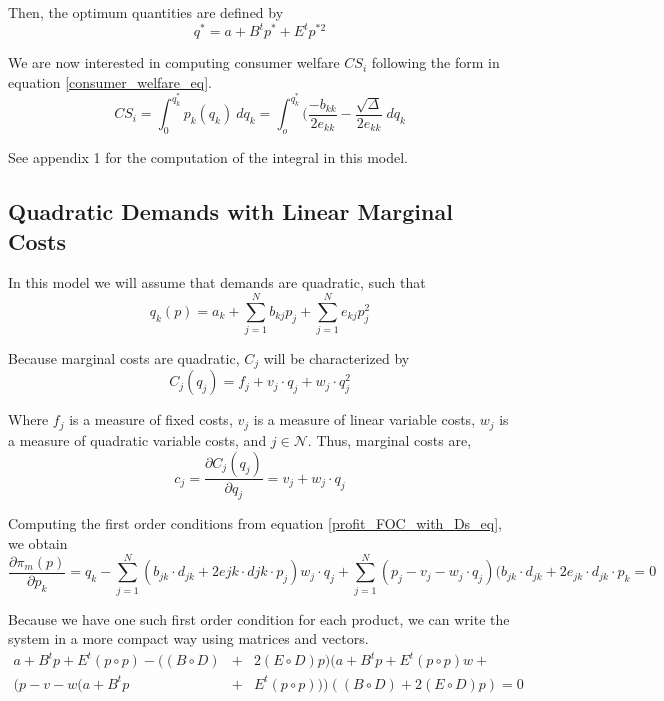 \documentclass[12pt]{article}
\begin{document}
Then, the optimum quantities are defined by 
\begin{equation*}
q^* = a + B^t p^* + E^t p^{*2}
\end{equation*}

We are now interested in computing consumer welfare $CS_i$ following the form in equation \ref{consumer_welfare_eq}.
\begin{equation*}
CS_i = \int_0^{q_k^*} p_k(q_k) \ dq_k = \int_o^{q_k^*} (\frac{-b_{kk}}{2e_{kk}} - \frac{\sqrt{\Delta}}{2e_{kk}} \ dq_k
\end{equation*}

See appendix 1 for the computation of the integral in this model.  

\subsection{Quadratic Demands with Linear Marginal Costs}

In this model we will assume that demands are quadratic, such that
\begin{equation*}
q_k(p) = a_k + \sum_{j = 1}^N b_{kj} p_j + \sum_{j = 1}^N e_{kj}p_j^2
\end{equation*}

Because marginal costs are quadratic, $C_j$ will be characterized by
\begin{equation*}
C_j(q_j) = f_j + v_j \cdot q_j + w_j \cdot q_j^2
\end{equation*}

Where $f_j$ is a measure of fixed costs, $v_j$ is a measure of linear variable costs, $w_j$ is a measure of quadratic variable costs, and $j \in \mathcal{N}$. Thus, marginal costs are,
\begin{equation*}
c_j = \frac{\partial C_j(q_j)}{\partial q_j}= v_j + w_j \cdot q_j
\end{equation*}

Computing the first order conditions from equation \ref{profit_FOC_with_Ds_eq}, we obtain
\begin{equation*}
\frac{\partial \pi_m(p)}{\partial p_k} = q_k - \sum_{j = 1}^N (b_{jk} \cdot d_{jk} + 2e{jk} \cdot d{jk} \cdot p_j) w_j \cdot q_j + \sum_{j = 1}^N (p_j - v_j - w_j \cdot q_j)(b_{jk} \cdot d_{jk} + 2e_{jk} \cdot d_{jk} \cdot p_k = 0
\end{equation*}

Because we have one such first order condition for each product, we can write the system in a more compact way using matrices and vectors. 
\begin{eqnarray*}
a + B^t p + E^t (p \circ p) - ((B \circ D) &+& 2(E \circ D)p) (a + B^t p + E^t (p \circ p) w + \\
(p - v - w(a + B^t p &+& E^t (p \circ p)))((B \circ D) + 2 (E \circ D) p) = 0
\end{eqnarray*}
\end{document}
